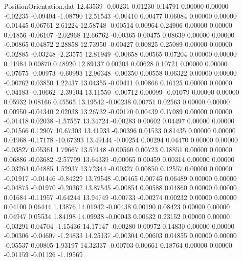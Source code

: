 \begin{filecontents}{PositionOrientation.dat}
  12.43539   -0.00231    0.01230     0.14791    0.00000    0.00000   -0.02235   -0.09404   -1.08790
  12.51543   -0.00410    0.00477     0.06084    0.00000    0.00000   -0.01445    0.06761    2.61224
  12.58748   -0.00514    0.00964     0.24906    0.00000    0.00000    0.01856   -0.06107   -2.02968
  12.66762   -0.00365    0.00475     0.08639    0.00000    0.00000   -0.00865    0.04872    2.28858
  12.73950   -0.00427    0.00825     0.25089    0.00000    0.00000   -0.02885   -0.03248   -2.23575
  12.81949   -0.00658    0.00565     0.07204    0.00000    0.00000    0.11984    0.00870    0.48920
  12.89137    0.00203    0.00628     0.10721    0.00000    0.00000   -0.07675   -0.00973   -0.60993
  12.96348   -0.00350    0.00558     0.06322    0.00000    0.00000   -0.00762    0.03850    1.22437
  13.04355   -0.00411    0.00866     0.16125    0.00000    0.00000   -0.04183   -0.10662   -2.39104
  13.11550   -0.00712    0.00099    -0.01079    0.00000    0.00000    0.05932    0.08166    0.45565
  13.19542   -0.00238    0.00751     0.02563    0.00000    0.00000    0.00950   -0.04340    2.02038
  13.26732   -0.00170    0.00439     0.17089    0.00000    0.00000   -0.01418    0.02038   -1.57557
  13.34724   -0.00283    0.00602     0.04497    0.00000    0.00000   -0.01566    0.12907   10.67303
  13.41933   -0.00396    0.01533     0.81435    0.00000    0.00000    0.01968   -0.17178  -10.67393
  13.49144   -0.00254    0.00294     0.04470    0.00000    0.00000   -0.03827    0.05361    1.79667
  13.57148   -0.00560    0.00723     0.18851    0.00000    0.00000    0.06886   -0.03682   -2.57799
  13.64339   -0.00065    0.00459     0.00314    0.00000    0.00000   -0.03264    0.04885    1.52937
  13.72344   -0.00327    0.00850     0.12557    0.00000    0.00000   -0.01917   -0.01446   -0.84229
  13.79548   -0.00465    0.00745     0.06489    0.00000    0.00000   -0.04875   -0.01970   -0.20362
  13.87545   -0.00854    0.00588     0.04860    0.00000    0.00000    0.01684   -0.11957   -0.64244
  13.94749   -0.00733   -0.00274     0.00232    0.00000    0.00000    0.04100    0.06444    1.13876
  14.01942   -0.00438    0.00190     0.08423    0.00000    0.00000    0.04947    0.05534    1.84198
  14.09938   -0.00043    0.00632     0.23152    0.00000    0.00000   -0.03291    0.04704   -1.15436
  14.17147   -0.00280    0.00972     0.14830    0.00000    0.00000   -0.00306   -0.04607   -1.24833
  14.25137   -0.00304    0.00603     0.04855    0.00000    0.00000   -0.05537    0.00805    1.93197
  14.32337   -0.00703    0.00661     0.18764    0.00000    0.00000   -0.01159   -0.01126   -1.19569

\end{filecontents}
